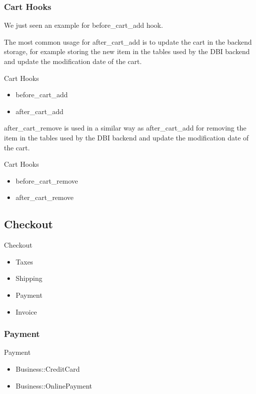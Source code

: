 \subsubsection{Cart Hooks}
We just seen an example for before_cart_add hook.

The most common usage for after_cart_add is to update the cart
in the backend storage, for example storing the new item in the tables 
used by the DBI backend and update the modification date of the cart.

\begin{frame}{Cart Hooks}
\begin{itemize}
\item before\_cart\_add
\item after\_cart\_add
\end{itemize}
\end{frame}

after_cart_remove is used in a similar way as after_cart_add 
for removing the item in the tables used by the DBI backend
and update the modification date of the cart.

\begin{frame}{Cart Hooks}
\begin{itemize}
\item before\_cart\_remove
\item after\_cart\_remove
\end{itemize}
\end{frame}

\subsection{Checkout}

\begin{frame}{Checkout}
\begin{itemize}
\item Taxes
\item Shipping
\item Payment
\item Invoice
\end{itemize}
\end{frame}

\subsubsection{Payment}
\begin{frame}{Payment}
\begin{itemize}
\item Business::CreditCard
\item Business::OnlinePayment
\end{itemize}
\end{frame}

